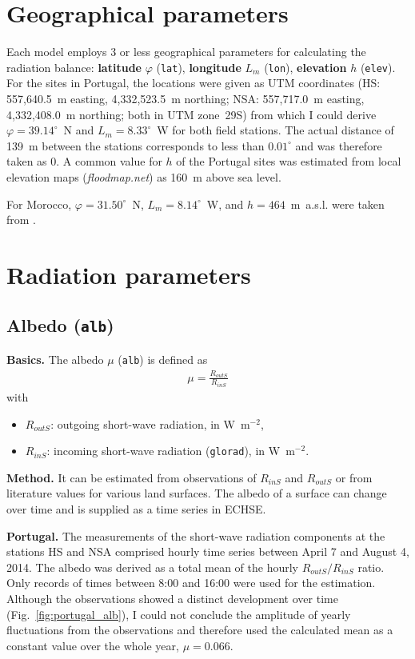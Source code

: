 \documentclass{scrreprt}
\newenvironment{denseitem}{
  \begin{itemize}
    \setlength{\itemsep}{0pt}
    \setlength{\parskip}{0pt}
    \setlength{\parsep}{0pt}
}{
  \end{itemize}
}
\begin{document}
\section{Geographical parameters} \label{sec:parest_geo}

Each model employs 3 or less geographical parameters for calculating the radiation balance: \textbf{latitude} $\varphi$ (\verb!lat!), \textbf{longitude} $L_m$ (\verb!lon!), \textbf{elevation} $h$ (\verb!elev!).
For the sites in Portugal, the locations were given as UTM coordinates (HS: 557,640.5~m easting, 4,332,523.5~m northing; NSA: 557,717.0~m easting, 4,332,408.0~m northing; both in UTM zone~29S) from which I could derive $\varphi = 39.14^\circ$~N and $L_m= 8.33^\circ$~W for both field stations.
The actual distance of 139~m between the stations corresponds to less than $0.01^\circ$ and was therefore taken as 0.
A common value for $h$ of the Portugal sites was estimated from local elevation maps (\emph{floodmap.net}) as 160~m above sea level.

For Morocco, $\varphi = 31.50^\circ$~N, $L_m = 8.14^\circ$~W, and $h = 464$~m~a.s.l. were taken from \citet{mroos14}.

\section{Radiation parameters} \label{sec:parest_rad}

\subsection{Albedo (\texttt{alb})} \label{ssec:parest_rad_alb}

\textbf{Basics.}
The albedo $\mu$ (\verb!alb!) is defined as
\begin{align*}
  \mu = \frac{R_{outS}}{R_{inS}}
\end{align*}
%
with
\begin{denseitem}
  \item[] $R_{outS}$: outgoing short-wave radiation, in W~m$^{-2}$,
  \item[] $R_{inS}$: incoming short-wave radiation (\verb!glorad!), in W~m$^{-2}$.
\end{denseitem}

\textbf{Method.}
It can be estimated from observations of $R_{inS}$ and $R_{outS}$ or from literature values for various land surfaces.
The albedo of a surface can change over time and is supplied as a time series in ECHSE.

\textbf{Portugal.}
The measurements of the short-wave radiation components at the stations HS and NSA comprised hourly time series between April 7 and August 4, 2014.
The albedo was derived as a total mean of the hourly $R_{outS}/R_{inS}$ ratio.
Only records of times between 8:00 and 16:00 were used for the estimation.
Although the observations showed a distinct development over time (Fig.~\ref{fig:portugal_alb}), I could not conclude the amplitude of yearly fluctuations from the observations and therefore used the calculated mean as a constant value over the whole year, $\mu = 0.066$.
\end{document}
